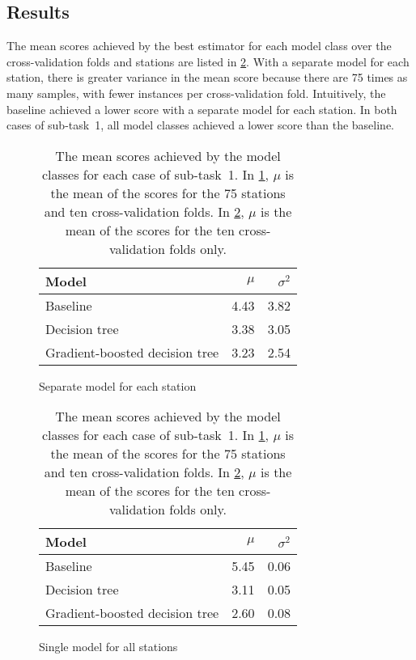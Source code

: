 \documentclass[11pt]{extarticle}
\begin{document}
\subsection{Results}

The mean scores achieved by the best estimator for each model class over the
cross-validation folds and stations are listed in \cref{tab:chart-subtask-1}.
With a separate model for each station, there is greater variance in the mean score
because there are 75 times as many samples, with fewer instances per cross-validation
fold.
Intuitively, the baseline achieved a lower score with a separate model for each
station.
In both cases of sub-task~1, all model classes achieved a lower score than the
baseline.

\begin{table}
  \centering
  \begin{subfigure}{0.49\textwidth}
    \centering
    \begin{tabular}{lrr}
      \toprule
      Model                          & $\mu$ & $\sigma^2$
      \\
      \midrule
      Baseline                       & 4.43  & 3.82
      \\
      Decision tree                  & 3.38  & 3.05
      \\
      Gradient-boosted decision tree & 3.23  & 2.54
      \\
      \bottomrule
    \end{tabular}
    \caption{Separate model for each station}
    \label{tab:chart-subtask-1-1}
  \end{subfigure}
  \begin{subfigure}{0.49\textwidth}
    \centering
    \begin{tabular}{lrr}
      \toprule
      Model                          & $\mu$ & $\sigma^2$
      \\
      \midrule
      Baseline                       & 5.45  & 0.06
      \\
      Decision tree                  & 3.11  & 0.05
      \\
      Gradient-boosted decision tree & 2.60  & 0.08
      \\
      \bottomrule
    \end{tabular}
    \caption{Single model for all stations}
    \label{tab:chart-subtask-1-2}
  \end{subfigure}
  \caption{The mean scores achieved by the model classes for each case of sub-task~1.
    In \cref{tab:chart-subtask-1-1}, $\mu$ is the mean of the scores for the 75 stations
    and ten cross-validation folds.
    In \cref{tab:chart-subtask-1-2}, $\mu$ is the mean of the scores for the ten
    cross-validation folds only.
  }
  \label{tab:chart-subtask-1}
\end{table}
\end{document}
